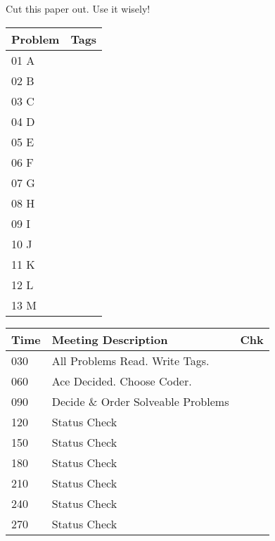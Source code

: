 Cut this paper out. Use it wisely!

\begin{tabular}{| l || m{6cm} | }
	\hline
	\textbf{Problem} & \textbf{Tags}\\	\hline
	01 A & \\	\hline
	02 B & \\	\hline
	03 C & \\	\hline
	04 D & \\	\hline
	05 E & \\	\hline
	06 F & \\	\hline
	07 G & \\	\hline
	08 H & \\	\hline
	09 I & \\	\hline
	10 J & \\	\hline
	11 K & \\	\hline
	12 L & \\	\hline
	13 M & \\	\hline
\end{tabular}
\newline\newline\newline
\begin{tabular}{| l | l || m{7mm}| }
	\hline
	\textbf{Time} & \textbf{Meeting Description} & \textbf{Chk} \\	\hline
	030 & All Problems Read. Write Tags. & 	\\	\hline
	060 & Ace Decided. Choose Coder.	&	\\	\hline
	090 & Decide \& Order Solveable Problems &	\\	\hline
	120 & Status Check &	\\	\hline
	150 & Status Check &	\\	\hline
	180 & Status Check &	\\	\hline
	210 & Status Check &	\\	\hline
	240 & Status Check &	\\	\hline
	270 & Status Check &	\\	\hline
\end{tabular}
